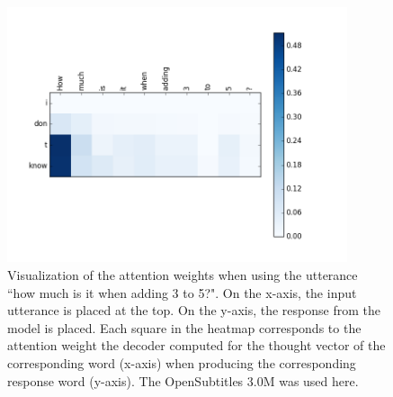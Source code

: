 \begin{figure}[H]
	\centering
	\includegraphics[width=10cm]{img/attention/attention_visualization2_OpenSubtitle-3M.png}
	\caption{Visualization of the attention weights when using the utterance ``how much is it when adding 3 to 5?". On the x-axis, the input utterance is placed at the top. On the y-axis, the response from the model is placed. Each square in the heatmap corresponds to the attention weight the decoder computed for the thought vector of the corresponding word (x-axis) when producing the corresponding response word (y-axis). The OpenSubtitles 3.0M was used here.}
	\label{results:attention:example2:opensubtitles-3M}
\end{figure}

